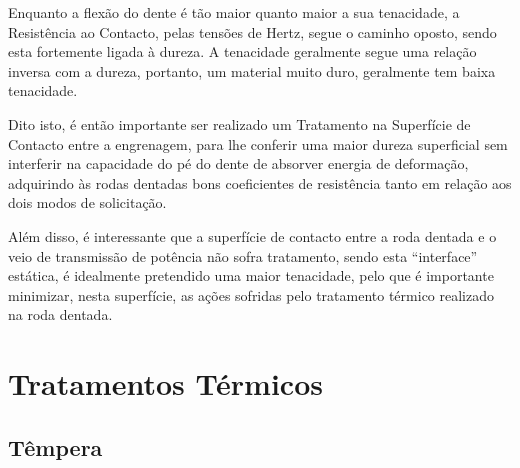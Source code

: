 \par  
Enquanto a flexão do dente é tão maior quanto maior a sua tenacidade, a Resistência ao Contacto, pelas tensões de Hertz, segue o caminho oposto, sendo esta fortemente ligada à dureza. A tenacidade geralmente segue uma relação inversa com a dureza, portanto, um material muito duro, geralmente tem baixa tenacidade.
\par
Dito isto, é então importante ser realizado um Tratamento na Superfície de Contacto entre a engrenagem, para lhe conferir uma maior dureza superficial sem interferir na capacidade do pé do dente de absorver energia de deformação, adquirindo às rodas dentadas bons coeficientes de resistência tanto em relação aos dois modos de solicitação.
\par
Além disso, é interessante que a superfície de contacto entre a roda dentada e o veio de transmissão de potência não sofra tratamento, sendo esta “interface” estática, é idealmente pretendido uma maior tenacidade, pelo que é importante minimizar, nesta superfície, as ações sofridas pelo tratamento térmico realizado na roda dentada.
\newpage
\section{Tratamentos Térmicos} \label{sec:soa_tratamentos}
\subsection{Têmpera} \label{ssec:soa_tratamentos_tempera}

